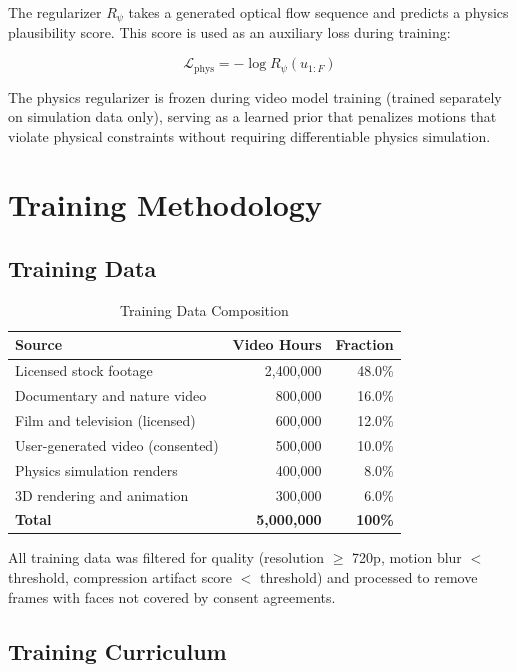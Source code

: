 \documentclass[11pt,a4paper]{article}
\begin{document}
The regularizer $R_\psi$ takes a generated optical flow sequence and predicts a physics plausibility score. This score is used as an auxiliary loss during training:

\begin{equation}
  \mathcal{L}_{\text{phys}} = -\log R_\psi(u_{1:F})
\end{equation}

The physics regularizer is frozen during video model training (trained separately on simulation data only), serving as a learned prior that penalizes motions that violate physical constraints without requiring differentiable physics simulation.

\section{Training Methodology}

\subsection{Training Data}

\begin{table}[H]
\centering
\caption{Training Data Composition}
\begin{tabular}{lrr}
\toprule
\textbf{Source} & \textbf{Video Hours} & \textbf{Fraction} \\
\midrule
Licensed stock footage & 2,400,000 & 48.0\% \\
Documentary and nature video & 800,000 & 16.0\% \\
Film and television (licensed) & 600,000 & 12.0\% \\
User-generated video (consented) & 500,000 & 10.0\% \\
Physics simulation renders & 400,000 & 8.0\% \\
3D rendering and animation & 300,000 & 6.0\% \\
\midrule
\textbf{Total} & \textbf{5,000,000} & \textbf{100\%} \\
\bottomrule
\end{tabular}
\end{table}

All training data was filtered for quality (resolution $\geq$ 720p, motion blur $<$ threshold, compression artifact score $<$ threshold) and processed to remove frames with faces not covered by consent agreements.

\subsection{Training Curriculum}
\end{document}
